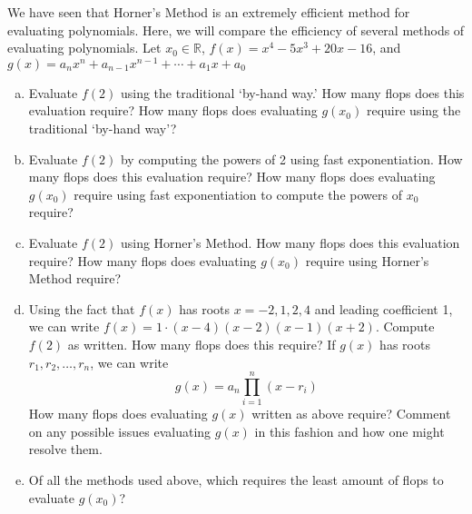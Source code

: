 \documentclass[11pt,letterpaper]{article}
\begin{document}


 We have seen that Horner's Method is an extremely efficient method for evaluating polynomials. Here, we will compare the efficiency of several methods of evaluating polynomials. Let $x_0 \in \mathbb{R}$, $f(x)= x^4 - 5x^3 + 20x - 16$, and $g(x)= a_nx^n + a_{n-1}x^{n-1} + \cdots + a_1x + a_0$
	\begin{enumerate}[(a)]
	\item Evaluate $f(2)$ using the traditional `by-hand way.' How many flops does this evaluation require? How many flops does evaluating $g(x_0)$ require using the traditional `by-hand way'?
	\item Evaluate $f(2)$ by computing the powers of 2 using fast exponentiation. How many flops does this evaluation require? How many flops does evaluating $g(x_0)$ require using fast exponentiation to compute the powers of $x_0$ require?
	\item Evaluate $f(2)$ using Horner's Method. How many flops does this evaluation require? How many flops does evaluating $g(x_0)$ require using Horner's Method require?
	\item Using the fact that $f(x)$ has roots $x= -2, 1, 2, 4$ and leading coefficient 1, we can write $f(x)= 1 \cdot (x - 4)(x - 2)(x - 1)(x + 2)$. Compute $f(2)$ as written. How many flops does this require? If $g(x)$ has roots $r_1, r_2, \ldots, r_n$, we can write
		\[
		g(x)= a_n \prod_{i=1}^n (x - r_i)
		\]
	How many flops does evaluating $g(x)$ written as above require? Comment on any possible issues evaluating $g(x)$ in this fashion and how one might resolve them. 
	\item Of all the methods used above, which requires the least amount of flops to evaluate $g(x_0)$?
	\end{enumerate}



\newpage
\end{document}
